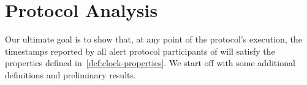 \section{Protocol Analysis}
\label{sec:protocol-analysis}

Our ultimate goal is to show that, at any point of the protocol's execution, the timestamps reported by all alert protocol participants of \timekeeper will satisfy the properties defined in~\cref{def:clock-properties}.
%
We start off with some additional definitions and preliminary results.







